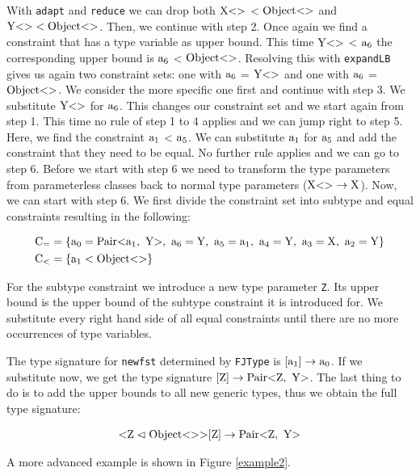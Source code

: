 With \verb|adapt| and \verb|reduce| we can drop both $\text{X} \text{<}  \text{>}$ < $\text{Object} \text{<}  \text{>}$ and $\text{Y} \text{<}  \text{>} < \text{Object} \text{<}  \text{>}$. Then, we continue with step 2.
Once again we find a constraint that has a type variable as upper bound. This time $\text{Y} \text{<}  \text{>}$ < $\text{a}_{6}$ the corresponding upper bound is $\text{a}_{6}$ < $\text{Object} \text{<}  \text{>}$.
Resolving this with \verb|expandLB| gives us again two constraint sets: one with $\text{a}_{6}$ = $\text{Y} \text{<}  \text{>}$ and one with $\text{a}_{6}$ = $\text{Object} \text{<}  \text{>}$. We consider the more specific one first and continue with step 3.
We substitute $\text{Y} \text{<}  \text{>}$ for $\text{a}_{6}$. This changes our constraint set and we start again from step 1. This time no rule of step 1 to 4 applies and we can jump right to step 5.
Here, we find the constraint $\text{a}_{1}$ < $\text{a}_{5}$. We can substitute $\text{a}_{1}$ for $\text{a}_{5}$ and add the constraint that they need to be equal.
No further rule applies and we can go to step 6. Before we start with step 6 we need to transform the type parameters from parameterless classes back to normal type parameters ($\text{X} \text{<}  \text{>} \to \text{X}$). Now, we can start with step 6. We first divide the constraint set into subtype and equal constraints resulting in the following:

\begin{align*}
    \text{C}_= &= \{ \fa{0} = \nvtt{Pair}{\fa{1}, \ \text{Y}}, \ \fa{6} = \text{Y}, \ \fa{5} = \fa{1}, \ \fa{4} = \text{Y}, \ \fa{3} = \text{X}, \ \fa{2} = \text{Y} \}\\
    \text{C}_< &= \{ \fa{1} < \nvtt{Object}{} \}
\end{align*}

For the subtype constraint we introduce a new type parameter \verb|Z|. Its upper bound is the upper bound of the subtype constraint it is introduced for.
We substitute every right hand side of all equal constraints until there are no more occurrences of type variables.

The type signature for \verb|newfst| determined by \verb|FJType| is $[\text{a}_{1}] \to \text{a}_{0}$. If we substitute now, we get the type signature $[\text{Z}] \to \nvtt{Pair}{\text{Z}, \ \text{Y}}$.
The last thing to do is to add the upper bounds to all new generic types, thus we obtain the full type signature:

\begin{align*}
    \text{<} \text{Z} \vartriangleleft \nvtt{Object}{}\text{>}[\text{Z}] \to \nvtt{Pair}{\text{Z}, \ \text{Y}}\\
\end{align*}

A more advanced example is shown in Figure \ref{example2}.

